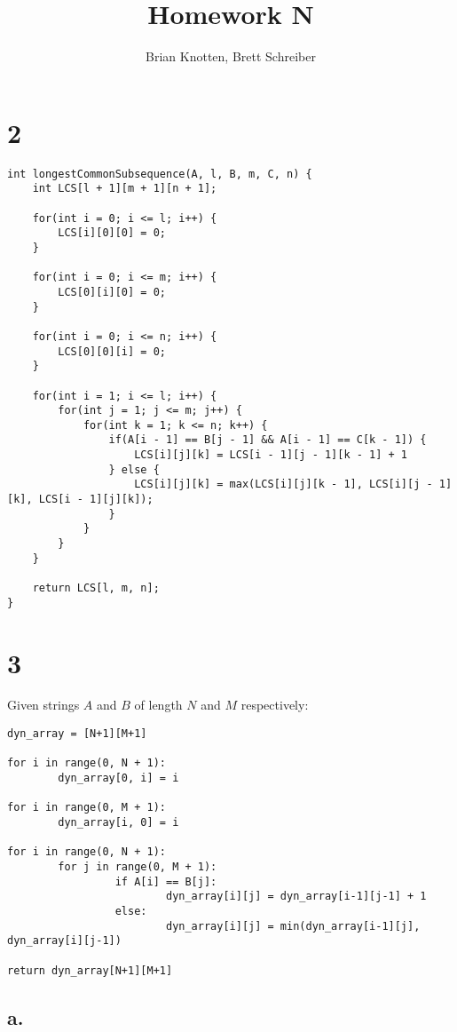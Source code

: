 \documentclass[letterpaper,notitlepage,twoside]{article}
\begin{document}
\title{Homework N}
\author{Brian Knotten, Brett Schreiber}
\maketitle

\section*{2}
\begin{verbatim}
int longestCommonSubsequence(A, l, B, m, C, n) {
    int LCS[l + 1][m + 1][n + 1];

    for(int i = 0; i <= l; i++) {
        LCS[i][0][0] = 0;
    }

    for(int i = 0; i <= m; i++) {
        LCS[0][i][0] = 0;
    }

    for(int i = 0; i <= n; i++) {
        LCS[0][0][i] = 0;
    }

    for(int i = 1; i <= l; i++) {
        for(int j = 1; j <= m; j++) {
            for(int k = 1; k <= n; k++) {
                if(A[i - 1] == B[j - 1] && A[i - 1] == C[k - 1]) {
                    LCS[i][j][k] = LCS[i - 1][j - 1][k - 1] + 1
                } else {
                    LCS[i][j][k] = max(LCS[i][j][k - 1], LCS[i][j - 1][k], LCS[i - 1][j][k]);
                }
            }
        }
    }

    return LCS[l, m, n];
}
\end{verbatim}
\section*{3}
Given strings $A$ and $B$ of length $N$ and $M$ respectively:
\begin{verbatim}
dyn_array = [N+1][M+1]

for i in range(0, N + 1):	
        dyn_array[0, i] = i

for i in range(0, M + 1):	
        dyn_array[i, 0] = i

for i in range(0, N + 1):
        for j in range(0, M + 1):
                 if A[i] == B[j]:
                         dyn_array[i][j] = dyn_array[i-1][j-1] + 1
                 else:
                         dyn_array[i][j] = min(dyn_array[i-1][j], dyn_array[i][j-1])

return dyn_array[N+1][M+1]
\end{verbatim}
\subsection*{a.}
\end{document}
